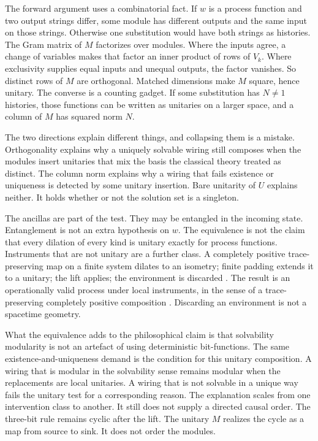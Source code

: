\documentclass[11pt]{article}
\begin{document}
The forward argument uses a combinatorial fact. If \(w\) is a process function and two output strings differ, some module has different outputs and the same input on those strings. Otherwise one substitution would have both strings as histories. The Gram matrix of \(M\) factorizes over modules. Where the inputs agree, a change of variables makes that factor an inner product of rows of \(V_k\). Where exclusivity supplies equal inputs and unequal outputs, the factor vanishes. So distinct rows of \(M\) are orthogonal. Matched dimensions make \(M\) square, hence unitary. The converse is a counting gadget. If some substitution has \(N\neq 1\) histories, those functions can be written as unitaries on a larger space, and a column of \(M\) has squared norm \(N\).

The two directions explain different things, and collapsing them is a mistake. Orthogonality explains why a uniquely solvable wiring still composes when the modules insert unitaries that mix the basis the classical theory treated as distinct. The column norm explains why a wiring that fails existence or uniqueness is detected by some unitary insertion. Bare unitarity of \(U\) explains neither. It holds whether or not the solution set is a singleton.

The ancillas are part of the test. They may be entangled in the incoming state. Entanglement is not an extra hypothesis on \(w\). The equivalence is not the claim that every dilation of every kind is unitary exactly for process functions. Instruments that are not unitary are a further class. A completely positive trace-preserving map on a finite system dilates to an isometry; finite padding extends it to a unitary; the lift applies; the environment is discarded \citep{stinespring1955}. The result is an operationally valid process under local instruments, in the sense of a trace-preserving completely positive composition \citep{oreshkov2012}. Discarding an environment is not a spacetime geometry.

What the equivalence adds to the philosophical claim is that solvability modularity is not an artefact of using deterministic bit-functions. The same existence-and-uniqueness demand is the condition for this unitary composition. A wiring that is modular in the solvability sense remains modular when the replacements are local unitaries. A wiring that is not solvable in a unique way fails the unitary test for a corresponding reason. The explanation scales from one intervention class to another. It still does not supply a directed causal order. The three-bit rule remains cyclic after the lift. The unitary \(M\) realizes the cycle as a map from source to sink. It does not order the modules.
\end{document}
